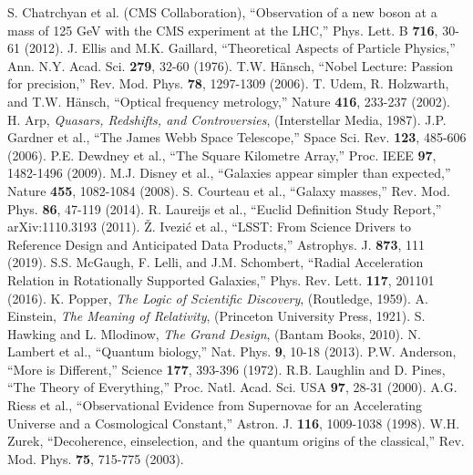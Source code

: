 \documentclass[twocolumn,aps,prl]{revtex4-2}
\begin{document}
\begin{thebibliography}{99}
		 S. Chatrchyan et al. (CMS Collaboration), ``Observation of a new boson at a mass of 125 GeV with the CMS experiment at the LHC,'' Phys. Lett. B \textbf{716}, 30-61 (2012).
		 J. Ellis and M.K. Gaillard, ``Theoretical Aspects of Particle Physics,'' Ann. N.Y. Acad. Sci. \textbf{279}, 32-60 (1976).
		 T.W. Hänsch, ``Nobel Lecture: Passion for precision,'' Rev. Mod. Phys. \textbf{78}, 1297-1309 (2006).
		 T. Udem, R. Holzwarth, and T.W. Hänsch, ``Optical frequency metrology,'' Nature \textbf{416}, 233-237 (2002).
		 H. Arp, \textit{Quasars, Redshifts, and Controversies}, (Interstellar Media, 1987).
		 J.P. Gardner et al., ``The James Webb Space Telescope,'' Space Sci. Rev. \textbf{123}, 485-606 (2006).
		 P.E. Dewdney et al., ``The Square Kilometre Array,'' Proc. IEEE \textbf{97}, 1482-1496 (2009).
		 M.J. Disney et al., ``Galaxies appear simpler than expected,'' Nature \textbf{455}, 1082-1084 (2008).
		 S. Courteau et al., ``Galaxy masses,'' Rev. Mod. Phys. \textbf{86}, 47-119 (2014).
		 R. Laureijs et al., ``Euclid Definition Study Report,'' arXiv:1110.3193 (2011).
		 Ž. Ivezić et al., ``LSST: From Science Drivers to Reference Design and Anticipated Data Products,'' Astrophys. J. \textbf{873}, 111 (2019).
		 S.S. McGaugh, F. Lelli, and J.M. Schombert, ``Radial Acceleration Relation in Rotationally Supported Galaxies,'' Phys. Rev. Lett. \textbf{117}, 201101 (2016).
		 K. Popper, \textit{The Logic of Scientific Discovery}, (Routledge, 1959).
		 A. Einstein, \textit{The Meaning of Relativity}, (Princeton University Press, 1921).
		 S. Hawking and L. Mlodinow, \textit{The Grand Design}, (Bantam Books, 2010).
		 N. Lambert et al., ``Quantum biology,'' Nat. Phys. \textbf{9}, 10-18 (2013).
		 P.W. Anderson, ``More is Different,'' Science \textbf{177}, 393-396 (1972).
		 R.B. Laughlin and D. Pines, ``The Theory of Everything,'' Proc. Natl. Acad. Sci. USA \textbf{97}, 28-31 (2000).
		 A.G. Riess et al., ``Observational Evidence from Supernovae for an Accelerating Universe and a Cosmological Constant,'' Astron. J. \textbf{116}, 1009-1038 (1998).
		 W.H. Zurek, ``Decoherence, einselection, and the quantum origins of the classical,'' Rev. Mod. Phys. \textbf{75}, 715-775 (2003).

\end{thebibliography}
\end{document}
